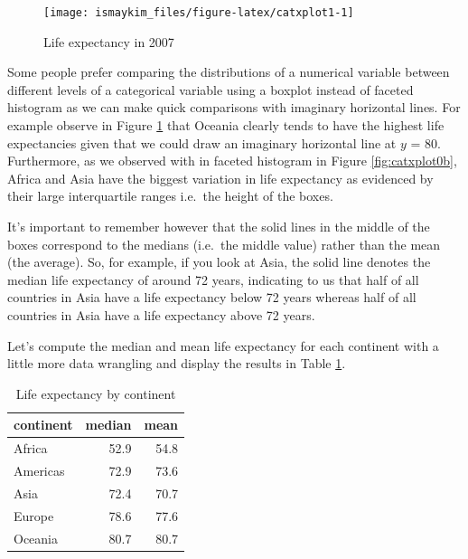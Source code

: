 \documentclass[12pt, krantz2,]{krantz}
\makeatletter
\newenvironment{Shaded}{\begin{snugshade}}{\end{snugshade}}
\newcommand{\DataTypeTok}[1]{\textcolor[rgb]{0.27,0.27,0.27}{#1}}
\newcommand{\KeywordTok}[1]{\textcolor[rgb]{0.27,0.27,0.27}{\textbf{#1}}}
\newcommand{\NormalTok}[1]{#1}
\newcommand{\OperatorTok}[1]{\textcolor[rgb]{0.43,0.43,0.43}{\textbf{#1}}}
\newcommand{\StringTok}[1]{\textcolor[rgb]{0.5,0.5,0.5}{#1}}
\newenvironment{kframe}{%
\medskip{}
\setlength{\fboxsep}{.8em}
 \def\at@end@of@kframe{}%
 \ifinner\ifhmode%
  \def\at@end@of@kframe{\end{minipage}}%
  \begin{minipage}{\columnwidth}%
 \fi\fi%
 \def\FrameCommand##1{\hskip\@totalleftmargin \hskip-\fboxsep
 \colorbox{shadecolor}{##1}\hskip-\fboxsep
     \hskip-\linewidth \hskip-\@totalleftmargin \hskip\columnwidth}%
 \MakeFramed {\advance\hsize-\width
   \@totalleftmargin\z@ \linewidth\hsize
   \@setminipage}}%
 {\par\unskip\endMakeFramed%
 \at@end@of@kframe}
\renewenvironment{Shaded}{\begin{kframe}}{\end{kframe}}
\makeatother
\begin{document}
\begin{figure}

{\centering \texttt{[image: ismaykim\_files/figure-latex/catxplot1-1]} 

}

\caption{Life expectancy in 2007}\label{fig:catxplot1}
\end{figure}

Some people prefer comparing the distributions of a numerical variable between different levels of a categorical variable using a boxplot instead of faceted histogram as we can make quick comparisons with imaginary horizontal lines. For example observe in Figure \ref{fig:catxplot1} that Oceania clearly tends to have the highest life expectancies given that we could draw an imaginary horizontal line at \(y\) = 80. Furthermore, as we observed with in faceted histogram in Figure \ref{fig:catxplot0b}, Africa and Asia have the biggest variation in life expectancy as evidenced by their large interquartile ranges i.e.~the height of the boxes.

It's important to remember however that the solid lines in the middle of the boxes correspond to the medians (i.e.~the middle value) rather than the mean (the average). So, for example, if you look at Asia, the solid line denotes the median life expectancy of around 72 years, indicating to us that half of all countries in Asia have a life expectancy below 72 years whereas half of all countries in Asia have a life expectancy above 72 years.

Let's compute the median and mean life expectancy for each continent with a little more data wrangling and display the results in Table \ref{tab:catxplot0}.

\begin{Shaded}
\end{Shaded}

\begin{table}[t]

\caption{\label{tab:catxplot0}Life expectancy by continent}
\centering
\begin{tabular}{lrr}
\toprule
continent & median & mean\\
\midrule
Africa & 52.9 & 54.8\\
Americas & 72.9 & 73.6\\
Asia & 72.4 & 70.7\\
Europe & 78.6 & 77.6\\
Oceania & 80.7 & 80.7\\
\bottomrule
\end{tabular}
\end{table}
\end{document}
